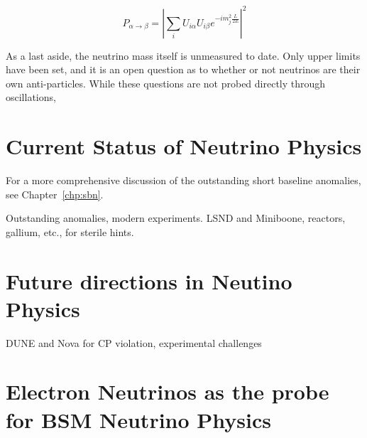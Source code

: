\begin{equation*}
P_{\alpha\rightarrow\beta} = \left|\sum_i U_{i\alpha} U_{i\beta} e^{-i m_j^2 \frac{L}{2E}}\right|^2
\end{equation*}



As a last aside, the neutrino mass itself is unmeasured to date.  Only upper limits have been set, and it is an open question as to whether or not neutrinos are their own anti-particles.  While these questions are not probed directly through oscillations, 

\section{Current Status of Neutrino Physics}

For a more comprehensive discussion of the outstanding short baseline anomalies, see Chapter~\ref{chp:sbn}.

Outstanding anomalies, modern experiments.  LSND and Miniboone, reactors, gallium, etc., for sterile hints.



\section{Future directions in Neutino Physics}
\label{sec:future_experiments}
DUNE and Nova for CP violation, experimental challenges

\section{Electron Neutrinos as the probe for BSM Neutrino Physics}